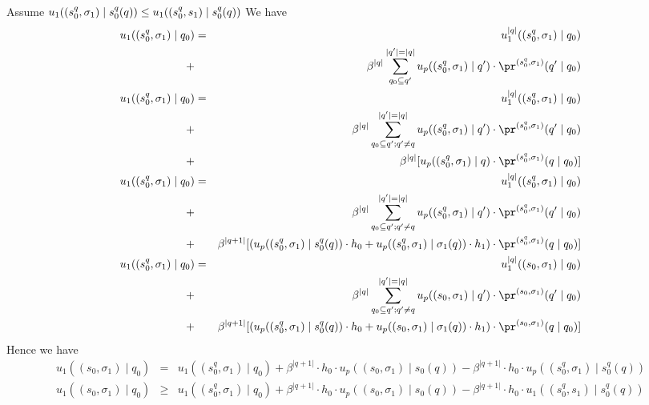 Assume $u_1((s_0^q,\sigma_1) \mid s^q_0(q))   \leq  u_1((s_0^q,s_1) \mid s_0^q(q))\\ $
We have
\begin{eqnarray*}
u_1((s^{q}_0,\sigma_1) \mid q_0) &= & u_1^{|q|}((s^q_0,\sigma_1) \mid q_0) \\
+ && \beta^{|q|} \sum_{q_0 \subseteq q'}^{|q'|=|q|} u_p((s^{q}_0,\sigma_1) \mid q') \cdot \pr^{(s^{q}_0,\sigma_1)}(q' \mid q_0) \\
u_1((s^{q}_0,\sigma_1) \mid q_0) &= & u_1^{|q|}((s^q_0,\sigma_1) \mid q_0) \\
+ && \beta^{|q|} \sum_{q_0 \subseteq q' ; q'\neq q}^{|q'|=|q|} u_p((s^{q}_0,\sigma_1) \mid q') \cdot \pr^{(s^{q}_0,\sigma_1)}(q' \mid q_0) \\
+ && \beta^{|q|} [  u_p((s^{q}_0,\sigma_1) \mid q) \cdot \pr^{(s^{q}_0,\sigma_1)}(q \mid q_0) ]\\
u_1((s^{q}_0,\sigma_1) \mid q_0) &= & u_1^{|q|}((s^q_0,\sigma_1) \mid q_0) \\
+ && \beta^{|q|} \sum_{q_0 \subseteq q' ; q'\neq q}^{|q'|=|q|} u_p((s^{q}_0,\sigma_1) \mid q') \cdot \pr^{(s^{q}_0,\sigma_1)}(q' \mid q_0) \\
+ && \beta^{|q+1|}[  (u_p((s^{q}_0,\sigma_1) \mid s^q_0(q))\cdot h_0 + u_p((s^{q}_0,\sigma_1) \mid \sigma_1(q))\cdot h_1  ) \cdot \pr^{(s^{q}_0,\sigma_1)}(q \mid q_0)] \\
u_1((s^{q}_0,\sigma_1) \mid q_0) &= & u_1^{|q|}((s_0,\sigma_1) \mid q_0) \\
+ && \beta^{|q|} \sum_{q_0 \subseteq q' ; q'\neq q}^{|q'|=|q|} u_p((s_0,\sigma_1) \mid q') \cdot \pr^{(s_0,\sigma_1)}(q' \mid q_0) \\
+ && \beta^{|q+1|}[  (u_p((s^{q}_0,\sigma_1) \mid s^q_0(q))\cdot h_0 + u_p((s_0,\sigma_1) \mid \sigma_1(q))\cdot h_1  ) \cdot \pr^{(s_0,\sigma_1)}(q \mid q_0)] \\
\end{eqnarray*}
Hence we have 
\begin{eqnarray*}
u_1((s_0,\sigma_1) \mid q_0) & = & u_1((s^{q}_0,\sigma_1) \mid q_0) + \beta^{|q+1|}\cdot h_0 \cdot u_p((s_0,\sigma_1) \mid s_0(q)) - \beta^{|q+1|}\cdot h_0 \cdot  u_p((s^{q}_0,\sigma_1) \mid s^q_0(q)) \\
u_1((s_0,\sigma_1) \mid q_0) & \geq & u_1((s^{q}_0,\sigma_1) \mid q_0) + \beta^{|q+1|}\cdot h_0 \cdot u_p((s_0,\sigma_1) \mid s_0(q)) - \beta^{|q+1|}\cdot h_0 \cdot  u_1((s_0^q,s_1) \mid s_0^q(q)) \\
\end{eqnarray*}

